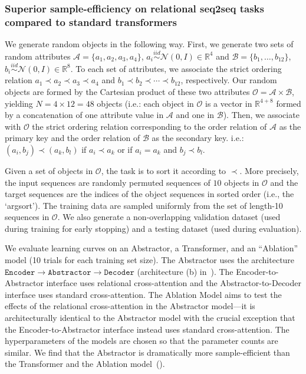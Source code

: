 \subsubsection{Superior sample-efficiency on relational seq2seq tasks compared to standard transformers}

We generate random objects in the following way. First, we generate two sets of random attributes $\mathcal{A} = \{a_1, a_2, a_3, a_4\}$, $a_i \overset{iid}{\sim} \mathcal{N}(0, I) \in \mathbb{R}^{4}$ and $\mathcal{B} = \{b_1, \ldots, b_{12}\}$, $b_i \overset{iid}{\sim} \mathcal{N}(0, I) \in \mathbb{R}^{8}$. To each set of attributes, we associate the strict ordering relation $a_1 \prec a_2 \prec a_3 \prec a_4$ and $b_1 \prec b_2 \prec \cdots \prec b_{12}$, respectively. Our random objects are formed by the Cartesian product of these two attributes $\mathcal{O} = \mathcal{A} \times \mathcal{B}$, yielding $N = 4 \times 12 = 48$ objects (i.e.: each object in $\mathcal{O}$ is a vector in $\mathbb{R}^{4+8}$ formed by a concatenation of one attribute value in $\mathcal{A}$ and one in $\mathcal{B}$). Then, we associate with $\mathcal{O}$ the strict ordering relation corresponding to the order relation of $\mathcal{A}$ as the primary key and the order relation of $\mathcal{B}$ as the secondary key. i.e.: $(a_i, b_j) \prec (a_k, b_l)$ if $a_i \prec a_k$ or if $a_i = a_k$ and $b_j \prec b_l$.

Given a set of objects in $\mathcal{O}$, the task is to sort it according to $\prec$. More precisely, the input sequences are randomly permuted sequences of $10$ objects in $\mathcal{O}$ and the target sequences are the indices of the object sequences in sorted order (i.e., the `argsort'). The training data are sampled uniformly from the set of length-10 sequences in $\mathcal{O}$. We also generate a non-overlapping validation dataset (used during training for early stopping) and a testing dataset (used during evaluation).

We evaluate learning curves on an Abstractor, a Transformer, and an ``Ablation'' model (10 trials for each training set size). The Abstractor uses the architecture $\texttt{Encoder} \to \texttt{Abstractor} \to \texttt{Decoder}$ (architecture (b) in~). The Encoder-to-Abstractor interface uses relational cross-attention and the Abstractor-to-Decoder interface uses standard cross-attention. The Ablation Model aims to test the effects of the relational cross-attention in the Abstractor model---it is architecturally identical to the Abstractor model with the crucial exception that the Encoder-to-Abstractor interface instead uses standard cross-attention. The hyperparameters of the models are chosen so that the parameter counts are similar. %
We find that the Abstractor is dramatically more sample-efficient than the Transformer and the Ablation model~().

